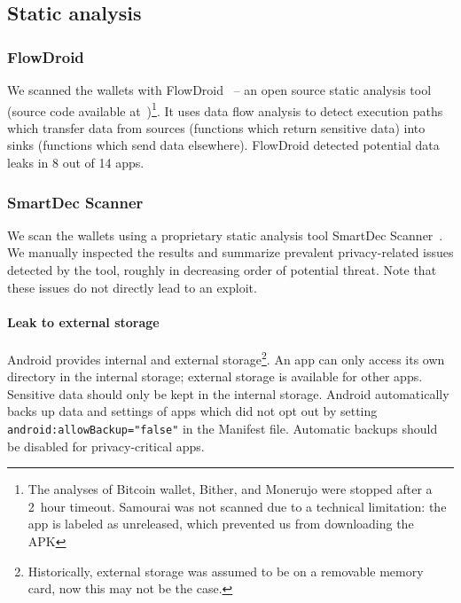 \subsection{Static analysis}

\subsubsection*{FlowDroid}

We scanned the wallets with FlowDroid~\cite{Arzt2014} -- an open source static analysis tool (source code available at~\cite{FlowDroid})\footnote{The analyses of Bitcoin wallet, Bither, and Monerujo were stopped after a 2~hour timeout. Samourai was not scanned due to a technical limitation: the app is labeled as unreleased, which prevented us from downloading the APK}.
It uses data flow analysis to detect execution paths which transfer data from sources (functions which return sensitive data) into sinks (functions which send data elsewhere).
FlowDroid detected potential data leaks in 8 out of 14 apps.

\subsubsection*{SmartDec Scanner}
We scan the wallets using a proprietary static analysis tool SmartDec Scanner~\cite{SmartDec2018}.
We manually inspected the results and summarize prevalent privacy-related issues detected by the tool, roughly in decreasing order of potential threat.
Note that these issues do not directly lead to an exploit.

\paragraph{Leak to external storage}
Android provides internal and external storage\footnote{Historically, external storage was assumed to be on a removable memory card, now this may not be the case.}.
An app can only access its own directory in the internal storage; external storage is available for other apps.
Sensitive data should only be kept in the internal storage.
Android automatically backs up data and settings of apps which did not opt out by setting \texttt{android:allowBackup="false"} in the Manifest file.
Automatic backups should be disabled for privacy-critical apps.

